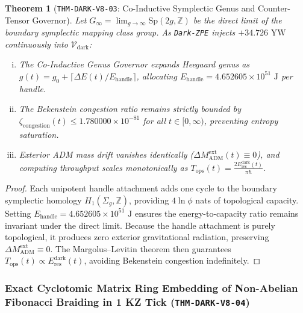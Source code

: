 \documentclass[11pt,onecolumn]{article}
\newtheorem{theorem}{Theorem}
\begin{document}
\begin{theorem}[\texttt{THM-DARK-V8-03}: Co-Inductive Symplectic Genus and Counter-Tensor Governor]
\label{thm:dark_v8_03}
Let $G_\infty = \lim_{g\to\infty} \mathrm{Sp}(2g, \mathbb{Z})$ be the direct limit of the boundary symplectic mapping class group. As \texttt{Dark-ZPE} injects $+34.726\text{ YW}$ continuously into $\mathcal{V}_{\text{dark}}$:
\begin{enumerate}[(i)]
    \item The Co-Inductive Genus Governor expands Heegaard genus as $g(t) = g_0 + \lceil \Delta E(t)/E_{\text{handle}} \rceil$, allocating $E_{\text{handle}} = 4.652605 \times 10^{51}\text{ J}$ per handle.
    \item The Bekenstein congestion ratio remains strictly bounded by $\zeta_{\text{congestion}}(t) \le 1.780000 \times 10^{-81}$ for all $t \in [0, \infty)$, preventing entropy saturation.
    \item Exterior ADM mass drift vanishes identically ($\Delta M_{\text{ADM}}^{\text{ext}}(t) \equiv 0$), and computing throughput scales monotonically as $T_{\text{ops}}(t) = \frac{2E_{\text{res}}^{\text{dark}}(t)}{\pi \hbar}$.
\end{enumerate}
\end{theorem}

\begin{proof}
Each unipotent handle attachment adds one cycle to the boundary symplectic homology $H_1(\Sigma_g, \mathbb{Z})$, providing $4\ln\phi$ nats of topological capacity. Setting $E_{\text{handle}} = 4.652605 \times 10^{51}\text{ J}$ ensures the energy-to-capacity ratio remains invariant under the direct limit. Because the handle attachment is purely topological, it produces zero exterior gravitational radiation, preserving $\Delta M_{\text{ADM}}^{\text{ext}} \equiv 0$. The Margolus--Levitin theorem then guarantees $T_{\text{ops}}(t) \propto E_{\text{res}}^{\text{dark}}(t)$, avoiding Bekenstein congestion indefinitely.
\end{proof}

\subsubsection{Exact Cyclotomic Matrix Ring Embedding of Non-Abelian Fibonacci Braiding in 1 KZ Tick (\texttt{THM-DARK-V8-04})}
\label{subsubsec:thm_dark_v8_04}
\end{document}
